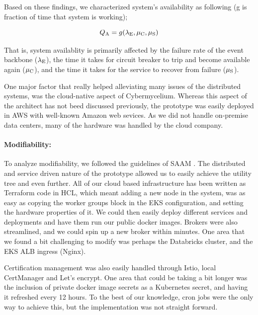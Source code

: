 \documentclass{bmcart}
\begin{document}
Based on these findings, we characterized system's availability as following (g is fraction of time that system is working);

\begin{equation}
    Q\textsubscript{A} = g(\lambda\textsubscript{E} , \mu\textsubscript{C}, \mu\textsubscript{S})
\end{equation}

That is, system availablity is primarily affected by the failure rate of the event backbone ($\lambda \textsubscript{E}$), the time it takes for circuit breaker to trip and become available again ($\mu\textsubscript{C}$), and the time it takes for the service to recover from failure ($\mu\textsubscript{S}$).

One major factor that really helped alleviating many issues of the distributed systems, was the cloud-native aspect of Cybermycelium. Whereas this aspect of the architect has not beed discussed previously, the prototype was easily deployed in AWS with well-known Amazon web sevices. As we did not handle on-premise data centers, many of the hardware was handled by the cloud company.

\paragraph{Modifiability:}

To analyze modifiability, we followed the guidelines of SAAM \cite{kazman1994saam}. The distributed and service driven nature of the prototype allowed us to easily achieve the utility tree and even further. All of our cloud based infrastructure has been written as Terraform code in HCL, which meant adding a new node in the system, was as easy as copying the worker groups block in the EKS configuration, and setting the hardware properties of it. We could then easily deploy different services and deployments and have them run our public docker images. Brokers were also streamlined, and we could spin up a new broker within minutes. One area that we found a bit challenging to modify was perhaps the Databricks cluster, and the EKS ALB ingress (Nginx).

Certification management was also easily handled through Istio, local CertManager and Let's encrypt. One area that could be taking a bit longer was the inclusion of private docker image secrets as a Kubernetes secret, and having it refreshed every 12 hours. To the best of our knowledge, cron jobs were the only way to achieve this, but the implementation was not straight forward.
\end{document}
